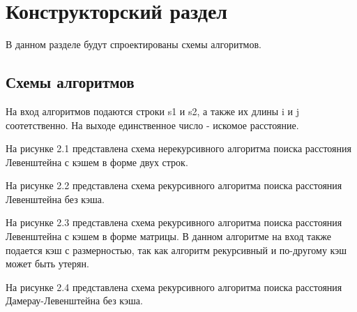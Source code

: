 \chapter{Конструкторский раздел}

В данном разделе будут спроектированы схемы алгоритмов.

\section{Схемы алгоритмов}

На вход алгоритмов подаются строки s1 и s2, а также их длины i и j соотетственно. На выходе единственное число - искомое расстояние.

На рисунке 2.1 представлена схема нерекурсивного алгоритма поиска расстояния Левенштейна с кэшем в форме двух строк.

На рисунке 2.2 представлена схема рекурсивного алгоритма поиска расстояния Левенштейна без кэша.

На рисунке 2.3 представлена схема рекурсивного алгоритма поиска расстояния Левенштейна с кэшем в форме матрицы. В данном алгоритме на вход также подается кэш с размерностью, так как алгоритм рекурсивный и по-другому кэш может быть утерян.

На рисунке 2.4 представлена схема рекурсивного алгоритма поиска расстояния Дамерау-Левенштейна без кэша.

